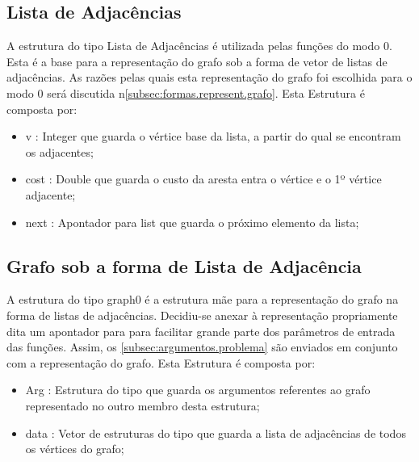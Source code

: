 \documentclass[14pt]{article}
\begin{document}
    \subsection[list]{Lista de Adjacências}\label{subsec:l.adj}
    A estrutura do tipo Lista de Adjacências é utilizada pelas funções do modo 0.
    Esta é a base para a representação do grafo sob a forma de vetor de listas de adjacências.
    As razões pelas quais esta representação do grafo foi escolhida para o modo 0 será discutida n\ref{subsec:formas.represent.grafo}.
    Esta Estrutura é composta por:
    \begin{itemize}
        \item v : Integer que guarda o vértice base da lista, a partir do qual se encontram os adjacentes;
        \item cost : Double que guarda o custo da aresta entra o vértice e o 1º vértice adjacente;
        \item next : Apontador para list que guarda o próximo elemento da lista;
    \end{itemize}

    \subsection[graph0]{Grafo sob a forma de Lista de Adjacência}\label{subsec:grafo.l.adj}
    A estrutura do tipo graph0 é a estrutura mãe para a representação do grafo na forma de listas de adjacências.
    Decidiu-se anexar à representação propriamente dita um apontador para  para
    facilitar grande parte dos parâmetros de entrada das funções.
    Assim, os \ref{subsec:argumentos.problema} são enviados em conjunto com a representação do grafo.
    Esta Estrutura é composta por:
    \begin{itemize}
        \item Arg : Estrutura do tipo  que guarda os argumentos referentes ao grafo
        representado no outro membro desta estrutura;
        \item data : Vetor de estruturas do tipo  que guarda a lista de adjacências de todos os
        vértices do grafo;
    \end{itemize}
\end{document}

